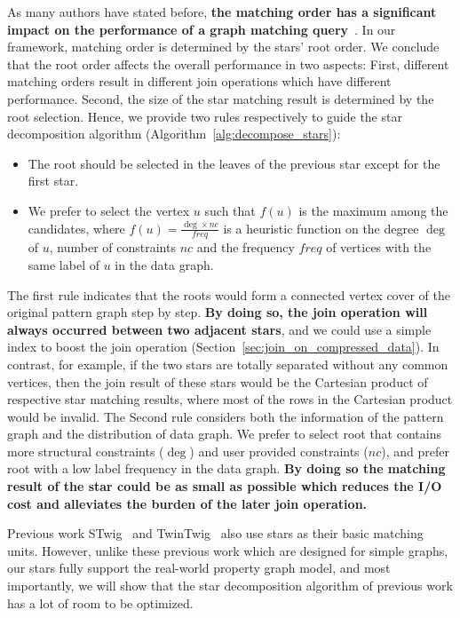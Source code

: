 As many authors have stated before,
\textbf{the matching order has a significant impact on the performance of a graph matching query}~\cite{DBLP:journals/pvldb/SunWWSL12,DBLP:conf/sigmod/HanLL13,DBLP:journals/pvldb/LaiQLC15}.
In our framework, matching order is determined by the stars' root order.
We conclude that the root order affects the overall performance in two aspects:
First, different matching orders result in different join operations which have different performance.
Second, the size of the star matching result is determined by the root selection.
Hence, we provide two rules respectively to guide the star decomposition algorithm (Algorithm~\ref{alg:decompose_stars}):
\begin{itemize}[noitemsep]
\item The root should be selected in the leaves of the previous star except for the first star.
\item We prefer to select the vertex $u$ such that $f(u)$ is the maximum among the candidates,
  where $f(u) = \frac{\deg \times nc}{freq}$ is a heuristic function on the degree $\deg$ of $u$,
  number of constraints $nc$ and the frequency $freq$ of vertices with the same label of $u$ in the data graph.
\end{itemize}

The first rule indicates that the roots would form a connected vertex cover of the original pattern graph step by step.
\textbf{By doing so, the join operation will always occurred between two adjacent stars},
and we could use a simple index to boost the join operation (Section~\ref{sec:join_on_compressed_data}).
In contrast, for example, if the two stars are totally separated without any common vertices,
then the join result of these stars would be the Cartesian product of respective star matching results,
where most of the rows in the Cartesian product would be invalid.
The Second rule considers both the information of the pattern graph and the distribution of data graph.
We prefer to select root that contains more structural constraints ($\deg$) and user provided constraints ($nc$),
and prefer root with a low label frequency in the data graph.
\textbf{By doing so the matching result of the star could be as small as possible which reduces the I/O cost and alleviates the burden of the later join operation.}

Previous work STwig~\cite{DBLP:journals/pvldb/SunWWSL12} and TwinTwig~\cite{DBLP:journals/pvldb/LaiQLC15} also use stars as their basic matching units.
However, unlike these previous work which are designed for simple graphs, our stars fully support the real-world property graph model, and most importantly, we will show that the star decomposition algorithm of previous work has a lot of room to be optimized.

